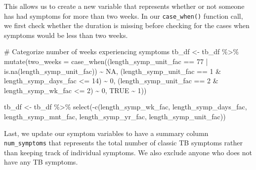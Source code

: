 \documentclass[
  letterpaper,
]{latex/krantz}
\makeatletter
\newenvironment{Shaded}{\begin{snugshade}}{\end{snugshade}}
\newcommand{\AttributeTok}[1]{\textcolor[rgb]{0.40,0.45,0.13}{#1}}
\newcommand{\CommentTok}[1]{\textcolor[rgb]{0.37,0.37,0.37}{#1}}
\newcommand{\ConstantTok}[1]{\textcolor[rgb]{0.56,0.35,0.01}{#1}}
\newcommand{\DecValTok}[1]{\textcolor[rgb]{0.68,0.00,0.00}{#1}}
\newcommand{\FunctionTok}[1]{\textcolor[rgb]{0.28,0.35,0.67}{#1}}
\newcommand{\NormalTok}[1]{\textcolor[rgb]{0.00,0.23,0.31}{#1}}
\newcommand{\OtherTok}[1]{\textcolor[rgb]{0.00,0.23,0.31}{#1}}
\newcommand{\SpecialCharTok}[1]{\textcolor[rgb]{0.37,0.37,0.37}{#1}}
\newenvironment{kframe}{%
\medskip{}
\setlength{\fboxsep}{.8em}
 \def\at@end@of@kframe{}%
 \ifinner\ifhmode%
  \def\at@end@of@kframe{\end{minipage}}%
  \begin{minipage}{\columnwidth}%
 \fi\fi%
 \def\FrameCommand##1{\hskip\@totalleftmargin \hskip-\fboxsep
 \colorbox{shadecolor}{##1}\hskip-\fboxsep
     \hskip-\linewidth \hskip-\@totalleftmargin \hskip\columnwidth}%
 \MakeFramed {\advance\hsize-\width
   \@totalleftmargin\z@ \linewidth\hsize
   \@setminipage}}%
 {\par\unskip\endMakeFramed%
 \at@end@of@kframe}
\renewenvironment{Shaded}{\begin{kframe}}{\end{kframe}}
\makeatother
\begin{document}
This allows us to create a new variable that represents whether or not
someone has had symptoms for more than two weeks. In our
\texttt{case\_when()}
function call, we first check whether the duration is missing before
checking for the cases when symptoms would be less than two weeks.

\begin{Shaded}
\begin{Highlighting}[]
\CommentTok{\# Categorize number of weeks experiencing symptoms}
\NormalTok{tb\_df }\OtherTok{\textless{}{-}}\NormalTok{ tb\_df }\SpecialCharTok{\%\textgreater{}\%}
  \FunctionTok{mutate}\NormalTok{(}\AttributeTok{two\_weeks =} \FunctionTok{case\_when}\NormalTok{((length\_symp\_unit\_fac }\SpecialCharTok{==} \DecValTok{77} \SpecialCharTok{|}
                      \FunctionTok{is.na}\NormalTok{(length\_symp\_unit\_fac)) }\SpecialCharTok{\textasciitilde{}} \ConstantTok{NA}\NormalTok{,}
\NormalTok{                   (length\_symp\_unit\_fac }\SpecialCharTok{==} \DecValTok{1} \SpecialCharTok{\&} 
\NormalTok{                      length\_symp\_days\_fac }\SpecialCharTok{\textless{}=} \DecValTok{14}\NormalTok{) }\SpecialCharTok{\textasciitilde{}} \DecValTok{0}\NormalTok{,}
\NormalTok{                   (length\_symp\_unit\_fac }\SpecialCharTok{==} \DecValTok{2} \SpecialCharTok{\&}
\NormalTok{                      length\_symp\_wk\_fac }\SpecialCharTok{\textless{}=} \DecValTok{2}\NormalTok{) }\SpecialCharTok{\textasciitilde{}} \DecValTok{0}\NormalTok{,}
                   \ConstantTok{TRUE} \SpecialCharTok{\textasciitilde{}} \DecValTok{1}\NormalTok{))}

\NormalTok{tb\_df }\OtherTok{\textless{}{-}}\NormalTok{ tb\_df }\SpecialCharTok{\%\textgreater{}\%} 
  \FunctionTok{select}\NormalTok{(}\SpecialCharTok{{-}}\FunctionTok{c}\NormalTok{(length\_symp\_wk\_fac, length\_symp\_days\_fac, }
\NormalTok{            length\_symp\_mnt\_fac, length\_symp\_yr\_fac, }
\NormalTok{            length\_symp\_unit\_fac))}
\end{Highlighting}
\end{Shaded}

Last, we update our symptom variables to have a summary column
\texttt{num\_symptoms} that represents the total number of classic TB
symptoms rather than keeping track of individual symptoms. We also
exclude anyone who does not have any TB symptoms.
\end{document}
